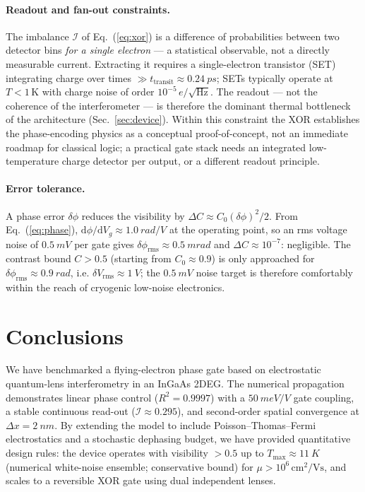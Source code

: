 \documentclass[11pt,a4paper]{article}
\begin{document}
\paragraph{Readout and fan-out constraints.} The imbalance
$\mathcal{I}$ of Eq.~(\ref{eq:xor}) is a difference of probabilities between
two detector bins \emph{for a single electron} — a statistical observable,
not a directly measurable current. Extracting it requires a single-electron
transistor (SET) integrating charge over times $\gg
t_{\mathrm{transit}}\approx\SI{0.24}{ps}$; SETs typically operate at
$T<1\,\mathrm{K}$ with charge noise of order
$10^{-5}\,e/\sqrt{\mathrm{Hz}}$. The readout — not the coherence of the
interferometer — is therefore the dominant thermal bottleneck of the
architecture (Sec.~\ref{sec:device}). Within this constraint the XOR
establishes the phase-encoding physics as a conceptual proof-of-concept,
not an immediate roadmap for classical logic; a practical gate stack needs
an integrated low-temperature charge detector per output, or a different
readout principle.

\paragraph{Error tolerance.} A phase error $\delta\phi$ reduces the visibility 
by $\Delta C \approx C_0(\delta\phi)^2/2$. From Eq.~(\ref{eq:phase}), 
$\mathrm{d}\phi/\mathrm{d}V_g\approx\SI{1.0}{rad/V}$ at the operating point, 
so an rms voltage noise of $\SI{0.5}{mV}$ per gate gives 
$\delta\phi_{\text{rms}}\approx\SI{0.5}{mrad}$ and $\Delta C\approx10^{-7}$: 
negligible. The contrast bound $C>0.5$ (starting from $C_0\approx0.9$) is only 
approached for $\delta\phi_{\text{rms}}\approx\SI{0.9}{rad}$, i.e. 
$\delta V_{\text{rms}}\approx\SI{1}{V}$; the $\SI{0.5}{mV}$ noise target is 
therefore comfortably within the reach of cryogenic low-noise electronics.

\section{Conclusions}
\label{sec:concl}

We have benchmarked a flying-electron phase gate based on electrostatic 
quantum-lens interferometry in an InGaAs 2DEG. The numerical propagation 
demonstrates linear phase control ($R^2=0.9997$) with a 
$\SI{50}{meV/V}$ gate coupling, a stable continuous read-out 
($\mathcal{I}\approx0.295$), and second-order spatial convergence at 
$\Delta x=\SI{2}{nm}$. By extending 
the model to include Poisson--Thomas--Fermi electrostatics and a stochastic 
dephasing budget, we have provided quantitative design rules: the device 
operates with visibility $>0.5$ up to $T_{\max}\approx\SI{11}{K}$ (numerical 
white-noise ensemble; conservative bound) for $\mu>10^6\,\text{cm}^2\text{/Vs}$, and scales to a reversible XOR gate using 
dual independent lenses.
\end{document}
